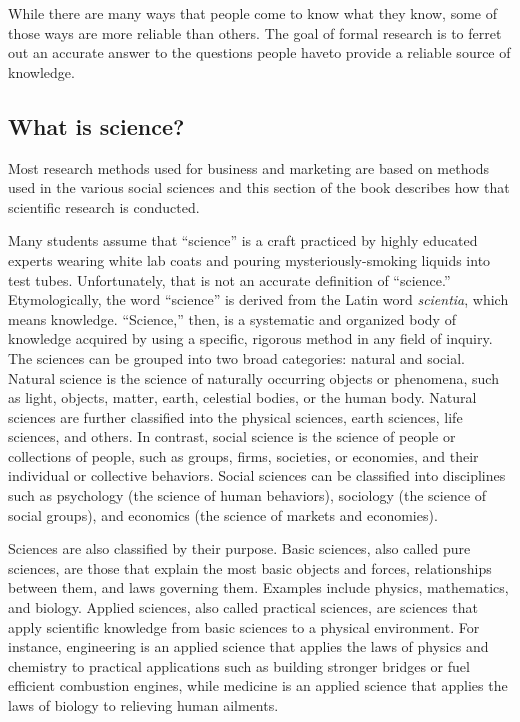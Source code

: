 While there are many ways that people come to know what they know, some of those ways are more reliable than others. The goal of formal research is to ferret out an accurate answer to the questions people have\textemdash to provide a reliable source of knowledge. 

\subsection{What is science?}

Most research methods used for business and marketing are based on methods used in the various social sciences and this section of the book describes how that scientific research is conducted.

Many students assume that ``science'' is a craft practiced by highly educated experts wearing white lab coats and pouring mysteriously-smoking liquids into test tubes. Unfortunately, that is not an accurate definition of ``science.'' Etymologically, the word ``science'' is derived from the Latin word \textit{scientia}, which means knowledge. ``Science,'' then, is a systematic and organized body of knowledge acquired by using a specific, rigorous method in any field of inquiry. The sciences can be grouped into two broad categories: natural and social. Natural science is the science of naturally occurring objects or phenomena, such as light, objects, matter, earth, celestial bodies, or the human body. Natural sciences are further classified into the physical sciences, earth sciences, life sciences, and others. In contrast, social science is the science of people or collections of people, such as groups, firms, societies, or economies, and their individual or collective behaviors. Social sciences can be classified into disciplines such as psychology (the science of human behaviors), sociology (the science of social groups), and economics (the science of markets and economies).

Sciences are also classified by their purpose. Basic sciences, also called pure sciences, are those that explain the most basic objects and forces, relationships between them, and laws governing them. Examples include physics, mathematics, and biology. Applied sciences, also called practical sciences, are sciences that apply scientific knowledge from basic sciences to a physical environment. For instance, engineering is an applied science that applies the laws of physics and chemistry to practical applications such as building stronger bridges or fuel efficient combustion engines, while medicine is an applied science that applies the laws of biology to relieving human ailments.

